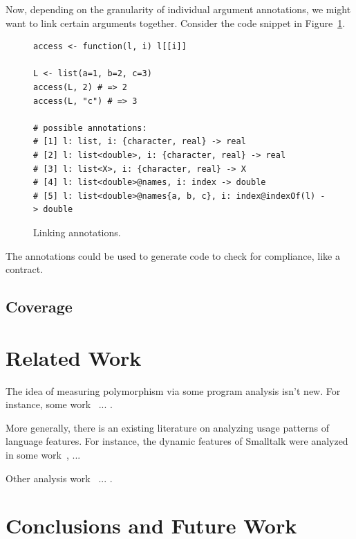 \documentclass[acmsmall,10pt,review,anonymous]{acmart}\settopmatter{printfolios=true,printccs=false,printacmref=false}
\begin{document}
Now, depending on the granularity of individual argument annotations, we might want to link certain arguments together.
Consider the code snippet in Figure~\ref{fig:indexof}.
\begin{figure}[!hb]{\small\begin{lstlisting}[style=R]
access <- function(l, i) l[[i]]

L <- list(a=1, b=2, c=3)
access(L, 2) # => 2
access(L, "c") # => 3

# possible annotations:
# [1] l: list, i: {character, real} -> real
# [2] l: list<double>, i: {character, real} -> real
# [3] l: list<X>, i: {character, real} -> X
# [4] l: list<double>@names, i: index -> double
# [5] l: list<double>@names{a, b, c}, i: index@indexOf(l) -> double
\end{lstlisting}}\caption{Linking annotations.}\label{fig:indexof}\end{figure}
The annotations could be used to generate code to check for compliance, like a contract.

%
%
%
%
\subsection{Coverage}


%
%
%
%
\section{Related Work}


The idea of measuring polymorphism via some program analysis isn't new.
For instance, some work~\cite{aakerblom2015measuring} ... .

More generally, there is an existing literature on analyzing usage patterns
of language features.  For instance, the dynamic features of Smalltalk were
analyzed in some work~\cite{callau2011howdevelopers}, ...

Other analysis work~\cite{milojkovic2017duck} ... .

\section{Conclusions and Future Work}



\end{document}
